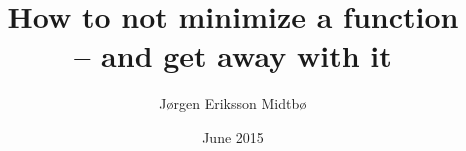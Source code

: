 \documentclass[twoside,english]{uiofysmaster}
\author{J\o rgen Eriksson Midtb\o}
\title{How to not minimize a function \\
-- and get away with it}
\date{June 2015}
\begin{document}
\begin{titlepage}
\maketitle
\end{titlepage}
\end{document}
